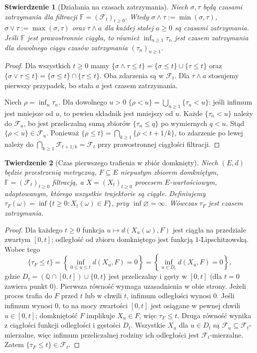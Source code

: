 \documentclass[11pt,a4paper,oneside]{report}
\numberwithin{equation}{chapter}
\theoremstyle{plain}
\newtheorem{twierdzenie}{Twierdzenie}[chapter]
\newtheorem{stwierdzenie}[twierdzenie]{Stwierdzenie}
\theoremstyle{definition}
\theoremstyle{remark}
\newcommand{\Q}{\mathbb{Q}}
\newcommand{\calF}{\mathcal{F}}
\begin{document}
\begin{stwierdzenie}[Działania na czasach zatrzymania]
Niech $\sigma,\tau$ będą czasami zatrzymania dla filtracji
$\mathbb F=(\calF_t)_{t\ge0}$. Wtedy
$\sigma\wedge\tau:=\min(\sigma,\tau)$,
$\sigma\vee\tau:=\max(\sigma,\tau)$ oraz
$\tau\wedge a$ dla każdej stałej $a\ge0$ są czasami
zatrzymania. Jeśli $\mathbb F$ jest prawostronnie ciągła,
to również $\inf_{n\ge1}\tau_n$ jest czasem zatrzymania
dla dowolnego ciągu czasów zatrzymania $(\tau_n)_{n\ge1}$.
\end{stwierdzenie}
\begin{proof}
Dla wszystkich $t\ge0$ mamy
$\{\sigma\wedge\tau\le t\}
=\{\sigma\le t\}\cup\{\tau\le t\}$ oraz
$\{\sigma\vee\tau\le t\}
=\{\sigma\le t\}\cap\{\tau\le t\}$.
Oba zdarzenia są w $\calF_t$.
Dla $\tau\wedge a$ stosujemy pierwszy przypadek,
bo stała $a$ jest czasem zatrzymania.

Niech $\rho=\inf_n\tau_n$. Dla dowolnego $u>0$
$\{\rho<u\}=\bigcup_{n\ge1}\{\tau_n<u\}$:
jeśli infimum jest mniejsze od $u$, to pewien
składnik jest mniejszy od $u$.
Każde $\{\tau_n<u\}$ należy do $\calF_u$,
bo jest przeliczalną sumą zbiorów
$\{\tau_n\le q\}$ po wymiernych $q<u$.
Stąd $\{\rho<u\}\in\calF_u$.
Ponieważ
$\{\rho\le t\}=\bigcap_{k\ge1}\{\rho<t+1/k\}$,
to zdarzenie po lewej należy do
$\bigcap_{k\ge1}\calF_{t+1/k}=\calF_t$
przy prawostronnej ciągłości filtracji.
\end{proof}

\begin{twierdzenie}[Czas pierwszego trafienia w zbiór domknięty]
\label{thm:hitting-closed}
Niech $(E,d)$ będzie przestrzenią metryczną,
$F\subseteq E$ niepustym zbiorem domkniętym,
$\mathbb F=(\calF_t)_{t\ge0}$ filtracją, a
$X=(X_t)_{t\ge0}$ procesem $E$-wartościowym,
adaptowanym, którego wszystkie trajektorie są ciągłe.
Definiujemy $\tau_F(\omega)=\inf\{t\ge0:X_t(\omega)\in F\}$,
przy $\inf\varnothing=\infty$.
Wówczas $\tau_F$ jest czasem zatrzymania.
\end{twierdzenie}
\begin{proof}
Dla każdego $t\ge0$ funkcja
$u\mapsto d(X_u(\omega),F)$ jest ciągła na
przedziale zwartym $[0,t]$; odległość od zbioru
domkniętego jest funkcją $1$-Lipschitzowską.
Wobec tego
\[
\{\tau_F\le t\}
=\left\{\inf_{0\le u\le t}d(X_u,F)=0\right\}
=\left\{\inf_{u\in D_t}d(X_u,F)=0\right\},
\]
gdzie $D_t=(\Q\cap[0,t])\cup\{0,t\}$ jest przeliczalny
i gęsty w $[0,t]$ (dla $t=0$ zawiera punkt $0$).
Pierwsza równość wymaga uzasadnienia w obie strony.
Jeżeli proces trafia do $F$ przed $t$ lub w chwili $t$,
infimum odległości wynosi $0$. Jeśli infimum wynosi $0$,
to na mocy zwartości $[0,t]$ jest osiągane w pewnej
chwili $u\in[0,t]$; domkniętość $F$ implikuje
$X_u\in F$, więc $\tau_F\le t$.
Druga równość wynika z ciągłości funkcji odległości
i gęstości $D_t$.
Wszystkie $X_u$ dla $u\in D_t$ są
$\calF_u\subseteq\calF_t$-mierzalne,
więc infimum przeliczalnej rodziny ich odległości
jest $\calF_t$-mierzalne. Zatem
$\{\tau_F\le t\}\in\calF_t$.
\end{proof}
\end{document}
